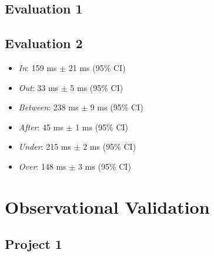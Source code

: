 
\subsection{Evaluation 1}





\subsection{Evaluation 2}


\begin{itemize}[noitemsep]
  \item \emph{In}: 159 ms $\pm$ 21 ms (95\% CI)
  \item \emph{Out}: 33 ms $\pm$ 5 ms (95\% CI)
  \item \emph{Between}: 238 ms $\pm$ 9 ms (95\% CI)
  \item \emph{After}: 45 ms $\pm$ 1 ms (95\% CI)
  \item \emph{Under}: 215 ms $\pm$ 2 ms (95\% CI)
  \item \emph{Over}: 148 ms $\pm$ 3 ms (95\% CI)
\end{itemize}


\section{Observational Validation}


\subsection{Project 1}





